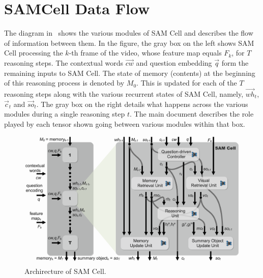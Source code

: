 \section{SAMCell Data Flow}
\label{sec:samcell-detail}

The diagram in~ shows the various modules of 
SAM Cell and describes the flow of information between them.
In the figure, the gray box on the left shows SAM Cell processing the $k$-th frame of the video, whose feature map equals $F_k$, for $T$ reasoning steps.
The contextual words $\vec{cw}$ and question embedding $\vec{q}$ form the remaining
inputs to SAM Cell.
The state of memory (contents) at the beginning of this reasoning process is denoted by $M_0$. This is updated for each of the $T$ reasoning steps along with the various recurrent states of SAM Cell, namely, $\vec{wh}_t$, $\vec{c}_t$ and $\vec{so}_t$. 
The gray box on the right details what happens across the various modules
during a single reasoning step $t$.
The main document describes the role played by each tensor shown going between
various modules within that box.
\begin{figure}[hbtp]
	\centering
	\includegraphics[width=\textwidth]{../img/architecture/samcell_reasoning}
	\caption{Archirecture of SAM Cell.}
	\label{fig:samcell}
\end{figure}

\clearpage

